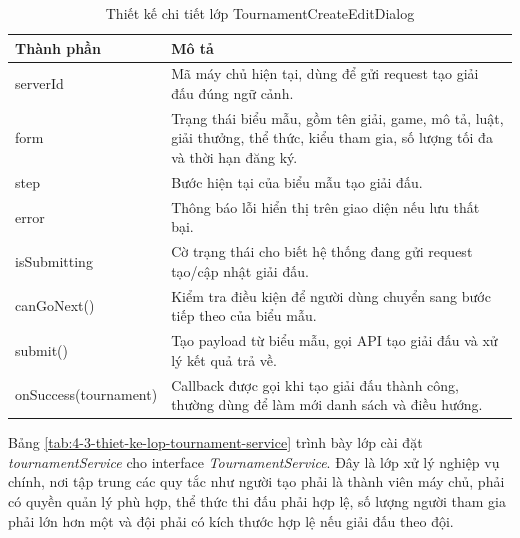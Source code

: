 \begin{table}[H]
    \centering
    \caption{Thiết kế chi tiết lớp TournamentCreateEditDialog}
    \label{tab:4-2-thiet-ke-lop-tournament-dialog}
    \begin{tabular}{|p{}|p{}|}
        \hline
        \textbf{Thành phần} & \textbf{Mô tả} \\ \hline
        serverId & Mã máy chủ hiện tại, dùng để gửi request tạo giải đấu đúng ngữ cảnh. \\ \hline
        form & Trạng thái biểu mẫu, gồm tên giải, game, mô tả, luật, giải thưởng, thể thức, kiểu tham gia, số lượng tối đa và thời hạn đăng ký. \\ \hline
        step & Bước hiện tại của biểu mẫu tạo giải đấu. \\ \hline
        error & Thông báo lỗi hiển thị trên giao diện nếu lưu thất bại. \\ \hline
        isSubmitting & Cờ trạng thái cho biết hệ thống đang gửi request tạo/cập nhật giải đấu. \\ \hline
        canGoNext() & Kiểm tra điều kiện để người dùng chuyển sang bước tiếp theo của biểu mẫu. \\ \hline
        submit() & Tạo payload từ biểu mẫu, gọi API tạo giải đấu và xử lý kết quả trả về. \\ \hline
        onSuccess(tournament) & Callback được gọi khi tạo giải đấu thành công, thường dùng để làm mới danh sách và điều hướng. \\ \hline
    \end{tabular}
\end{table}

Bảng \ref{tab:4-3-thiet-ke-lop-tournament-service} trình bày lớp cài đặt \textit{tournamentService} cho interface \textit{TournamentService}. Đây là lớp xử lý nghiệp vụ chính, nơi tập trung các quy tắc như người tạo phải là thành viên máy chủ, phải có quyền quản lý phù hợp, thể thức thi đấu phải hợp lệ, số lượng người tham gia phải lớn hơn một và đội phải có kích thước hợp lệ nếu giải đấu theo đội.

